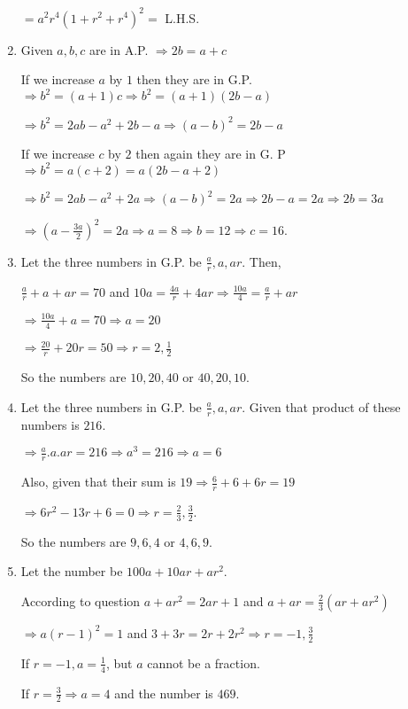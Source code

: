 \begin{enumerate}
  $= a^2r^4(1 + r^2 + r^4)^2 =$ L.H.S.
\item Given $a, b, c$ are in A.P. $\Rightarrow 2b = a + c$

  If we increase $a$ by $1$ then they are in G.P. $\Rightarrow b^2 = (a + 1)c \Rightarrow b^2 = (a + 1)(2b - a)$

  $\Rightarrow b^2 = 2ab - a^2 + 2b - a \Rightarrow (a - b)^2 = 2b - a$

  If we increase $c$ by $2$ then again they are in G. P $\Rightarrow b^2 = a(c + 2) = a(2b - a + 2)$

  $\Rightarrow b^2 = 2ab - a^2 + 2a \Rightarrow (a - b)^2 = 2a \Rightarrow 2b - a = 2a \Rightarrow 2b = 3a$

  $\Rightarrow \left(a - \frac{3a}{2}\right)^2 = 2a \Rightarrow a = 8 \Rightarrow b = 12 \Rightarrow c = 16$.
\item Let the three numbers in G.P. be $\frac{a}{r}, a, ar$. Then,

  $\frac{a}{r} + a + ar = 70$ and $10a = \frac{4a}{r} + 4ar \Rightarrow \frac{10a}{4} = \frac{a}{r} + ar$

  $\Rightarrow \frac{10a}{4} + a = 70 \Rightarrow a = 20$

  $\Rightarrow \frac{20}{r} + 20r = 50 \Rightarrow r = 2, \frac{1}{2}$

  So the numbers are $10, 20, 40$ or $40, 20, 10$.
\item Let the three numbers in G.P. be $\frac{a}{r}, a, ar$. Given that product of these numbers is $216$.

  $\Rightarrow \frac{a}{r}.a.ar = 216 \Rightarrow a^3 = 216 \Rightarrow a = 6$

  Also, given that their sum is $19 \Rightarrow \frac{6}{r} + 6 + 6r = 19$

  $\Rightarrow 6r^2 - 13r + 6 = 0 \Rightarrow r = \frac{2}{3}, \frac{3}{2}$.

  So the numbers are $9, 6, 4$ or $4, 6, 9$.
\item Let the number be $100a + 10ar + ar^2$.

  According to question $a + ar^2 = 2ar + 1$ and $a + ar = \frac{2}{3}(ar + ar^2)$

  $\Rightarrow a(r - 1)^2 = 1$ and $3 + 3r = 2r + 2r^2 \Rightarrow r = -1, \frac{3}{2}$

  If $r = -1, a = \frac{1}{4}$, but $a$ cannot be a fraction.

  If $r = \frac{3}{2} \Rightarrow a = 4$ and the number is $469$.
\end{enumerate}

